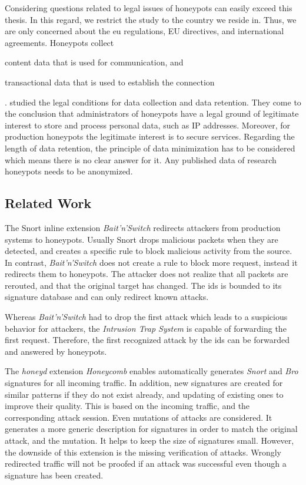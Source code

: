 Considering questions related to legal issues of honeypots can easily exceed this thesis.
In this regard, we restrict the study to the country we reside in.
Thus, we are only concerned about the \ac{eu} regulations, EU directives, and international agreements.
Honeypots collect
\begin{enumerate*}[label=(\roman*)]
    \item content data that is used for communication, and
    \item transactional data that is used to establish the connection
\end{enumerate*}.
\citet{sokol2017} studied the legal conditions for data collection and data retention. They come to the conclusion that administrators of honeypots have a legal ground of legitimate interest to store and process personal data, such as IP addresses. Moreover, for production honeypots the legitimate interest is to secure services. Regarding the length of data retention, the principle of data minimization has to be considered which means there is no clear answer for it. Any published data of research honeypots needs to be anonymized.

\subsection{Related Work}

The Snort \cite{caswell2003} inline extension \textit{Bait'n'Switch} \cite{gonzalez2003} redirects attackers from production systems to honeypots.
Usually Snort drops malicious packets when they are detected, and creates a specific rule to block malicious activity from the source.
In contrast, \textit{Bait'n'Switch} does not create a rule to block more request, instead it redirects them to honeypots.
The attacker does not realize that all packets are rerouted, and that the original target has changed.
The \ac{ids} is bounded to its signature database and can only redirect known attacks.\cite{Diebold2005}

Whereas \textit{Bait'n'Switch} had to drop the first attack which leads to a suspicious behavior for attackers, the \textit{Intrusion Trap System} \cite{takemori2003} is capable of forwarding the first request.
Therefore, the first recognized attack by the \ac{ids} can be forwarded and answered by honeypots. \cite{Diebold2005}

The \textit{honeyd} \cite{Provos2003} extension \textit{Honeycomb} \cite{kreibich2004} enables automatically generates \textit{Snort} and \textit{Bro} \cite{paxson1999} signatures for all incoming traffic.
In addition, new signatures are created for similar patterns if they do not exist already, and updating of existing ones to improve their quality.
This is based on the incoming traffic, and the corresponding attack session.
Even mutations of attacks are considered.
It generates a more generic description for signatures in order to match the original attack, and the mutation.
It helps to keep the size of signatures small.
However, the downside of this extension is the missing verification of attacks.
Wrongly redirected traffic will not be proofed if an attack was successful even though a signature has been created. \cite{Diebold2005}
